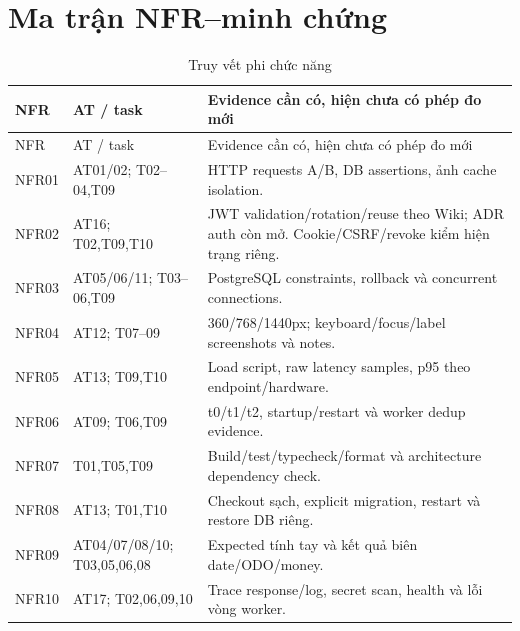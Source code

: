 \section{Ma trận NFR--minh chứng}
\begin{smalltable}\begin{longtable}{L{1.4cm}L{3cm}L{10.4cm}}
\caption{Truy vết phi chức năng}\label{tab:trace-nfr}\\\toprule NFR & AT / task & Evidence cần có, hiện chưa có phép đo mới\\\midrule\endfirsthead
\toprule NFR & AT / task & Evidence cần có, hiện chưa có phép đo mới\\\midrule\endhead
NFR01 & AT01/02; T02--04,T09 & HTTP requests A/B, DB assertions, ảnh cache isolation.\\
NFR02 & AT16; T02,T09,T10 & JWT validation/rotation/reuse theo Wiki; ADR auth còn mở. Cookie/CSRF/revoke kiểm hiện trạng riêng.\\
NFR03 & AT05/06/11; T03--06,T09 & PostgreSQL constraints, rollback và concurrent connections.\\
NFR04 & AT12; T07--09 & 360/768/1440px; keyboard/focus/label screenshots và notes.\\
NFR05 & AT13; T09,T10 & Load script, raw latency samples, p95 theo endpoint/hardware.\\
NFR06 & AT09; T06,T09 & t0/t1/t2, startup/restart và worker dedup evidence.\\
NFR07 & T01,T05,T09 & Build/test/typecheck/format và architecture dependency check.\\
NFR08 & AT13; T01,T10 & Checkout sạch, explicit migration, restart và restore DB riêng.\\
NFR09 & AT04/07/08/10; T03,05,06,08 & Expected tính tay và kết quả biên date/ODO/money.\\
NFR10 & AT17; T02,06,09,10 & Trace response/log, secret scan, health và lỗi vòng worker.\\\bottomrule
\end{longtable}\end{smalltable}

